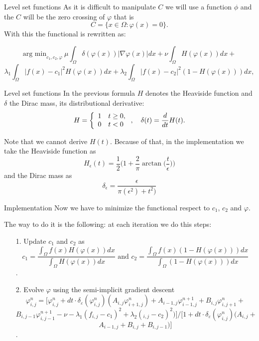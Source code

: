 \documentclass[11pt]{beamer}
\begin{document}
\begin{frame}{Level set functions}
As it is difficult to manipulate $C$ we will use a function $\phi$ and the $C$ will be the zero crossing of $\varphi$ that is 
$$C = \{x\in \Omega:\varphi(x) = 0\}.$$
With this the functional is rewritten as:

$$\text{arg min}_{c_1, c_2, \varphi}\ \mu \int_{\Omega}\delta(\varphi(x))|\nabla\varphi(x)|dx+\nu \int_{\Omega}H(\varphi(x))dx +$$$$ \lambda_1\int_{\Omega}|f(x)-c_1|^2H(\varphi(x))dx + \lambda_2\int_{\Omega}|f(x) -c_2|^2(1-H(\varphi(x)))dx,$$
\end{frame}
\begin{frame}{Level set functions}
In the previous formula $H$ denotes the Heaviside function and $\delta$ the Dirac mass, its distributional derivative:
$$ H = \left\lbrace\begin{array}{l l}
1&t\geq 0,\\
0 & t<0
\end{array}\right. ,\quad \delta(t) = \frac{d}{dt}H(t).$$

Note that we cannot derive $H(t)$. Because of that, in the implementation we take the Heaviside function as
$$H_{\epsilon}(t) = \frac{1}{2}\bigg(1 + \frac{2}{\pi}\arctan \bigg(\frac{t}{\epsilon}\bigg)\bigg)$$
and the Dirac mass as
$$\delta_{\epsilon} = \frac{\epsilon}{\pi(\epsilon^2)+t^2)}$$
\end{frame}



\begin{frame}{Implementation}
Now we have to minimize the functional respect to $c_1$, $c_2$ and $\varphi$.

The way to do it is the following: at each iteration we do this steps:
\begin{enumerate}
\item[1.] Update $c_1$ and $c_2$ as $$c_1 = \frac{\int_{\Omega}f(x)H(\varphi(x))dx}{\int_{\Omega}H(\varphi(x))dx} \text{ and } c_2 = \frac{\int_{\Omega}f(x)(1-H(\varphi(x)))dx}{\int_{\Omega}(1-H(\varphi(x)))dx}$$.
\item [2.] Evolve $\varphi$ using the semi-implicit gradient descent 
$$\varphi_{i,j}^n = [\varphi_{i,j}^n + dt\cdot\delta_{\varepsilon}(\varphi_{i,j}^n)(A_{i,j}\varphi_{i+1,j}^n) + A_{i-1,j}\varphi_{i-1,j}^{n+1}+B_{i,j}\varphi_{i,j+1}^n+$$
$$B_{i, j-1}\varphi_{i,j-1}^{n+1}-\nu - \lambda_1(f_{i,j}-c_1)^2+\lambda_2(_{i,j}-c_2)^2) ]/[1 + dt\cdot\delta_{\varepsilon}(\varphi_{i,j}^n)(A_{i,j} +$$$$ A_{i-1,j} + B_{i,j} + B_{i,j-1})]$$. 
\end{enumerate}
\end{frame}
\end{document}
